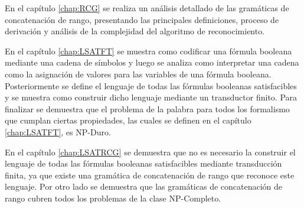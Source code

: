 En el capítulo \ref{chap:RCG} se realiza un análisis detallado de las gramáticas de concatenación de rango, presentando las principales
definiciones, proceso de derivación y análisis de la complejidad del algoritmo de reconocimiento.

En el capítulo \ref{chap:LSATFT} se muestra como codificar una fórmula booleana mediante una cadena de símbolos y luego
se analiza como interpretar una cadena como la asignación de valores para las variables de una fórmula booleana.
Posteriormente se define el lenguaje de todas las fórmulas booleanas satisfacibles y se muestra como construir dicho
lenguaje mediante un transductor finito. Para finalizar se demuestra que el problema de la palabra para todos los formalismo que cumplan ciertas propiedades,
las cuales se definen en el capítulo \ref{chap:LSATFT}, es NP-Duro.

En el capítulo \ref{chap:LSATRCG} se demuestra que no es necesario la construir el lenguaje de todas las fórmulas
booleanas satisfacibles mediante transducción finita, ya que existe una gramática de concatenación de rango que reconoce
este lenguaje. Por otro lado se demuestra que las gramáticas de concatenación de rango cubren todos los problemas de la clase NP-Completo.

